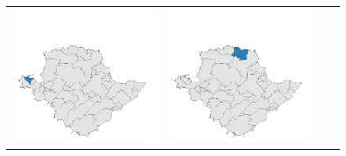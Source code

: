 \begin{figure}[p]
\begin{tabularx}{1\textwidth}{XXXX}
\includegraphics[width=1\linewidth]{images/ch6/mergeoverall/05}&
\includegraphics[width=1\linewidth]{images/ch6/mergeoverall/06}&

\end{tabularx}
\end{figure}
